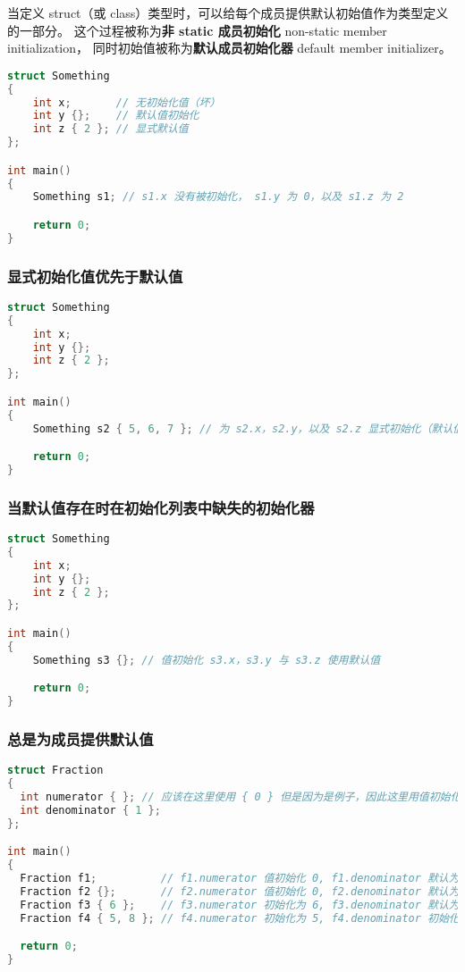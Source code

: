 \documentclass[../../LearnCpp.tex]{subfiles}
\begin{document}

当定义 struct（或 class）类型时，可以给每个成员提供默认初始值作为类型定义的一部分。
这个过程被称为\textbf{非 static 成员初始化} non-static member initialization，
同时初始值被称为\textbf{默认成员初始化器} default member initializer。

\begin{lstlisting}[language=C++]
struct Something
{
    int x;       // 无初始化值（坏）
    int y {};    // 默认值初始化
    int z { 2 }; // 显式默认值
};

int main()
{
    Something s1; // s1.x 没有被初始化， s1.y 为 0，以及 s1.z 为 2

    return 0;
}
\end{lstlisting}

\subsubsection*{显式初始化值优先于默认值}

\begin{lstlisting}[language=C++]
struct Something
{
    int x;
    int y {};
    int z { 2 };
};

int main()
{
    Something s2 { 5, 6, 7 }; // 为 s2.x，s2.y，以及 s2.z 显式初始化（默认值没有被使用）

    return 0;
}
\end{lstlisting}

\subsubsection*{当默认值存在时在初始化列表中缺失的初始化器}

\begin{lstlisting}[language=C++]
struct Something
{
    int x;
    int y {};
    int z { 2 };
};

int main()
{
    Something s3 {}; // 值初始化 s3.x，s3.y 与 s3.z 使用默认值

    return 0;
}
\end{lstlisting}

\subsubsection*{总是为成员提供默认值}

\begin{lstlisting}[language=C++]
struct Fraction
{
  int numerator { }; // 应该在这里使用 { 0 } 但是因为是例子，因此这里用值初始化
  int denominator { 1 };
};

int main()
{
  Fraction f1;          // f1.numerator 值初始化 0, f1.denominator 默认为 1
  Fraction f2 {};       // f2.numerator 值初始化 0, f2.denominator 默认为 1
  Fraction f3 { 6 };    // f3.numerator 初始化为 6, f3.denominator 默认为 1
  Fraction f4 { 5, 8 }; // f4.numerator 初始化为 5, f4.denominator 初始化为 8

  return 0;
}
\end{lstlisting}
\end{document}
